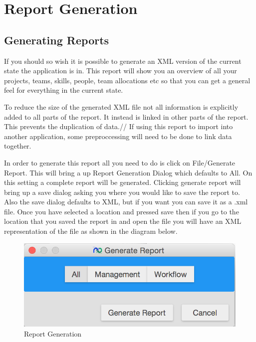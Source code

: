 \section{Report Generation}

\subsection{Generating Reports}

If you should so wish it is possible to generate an XML version of the current state the application is in. This report will show you an overview of all your projects, teams, skills, people, team allocations etc so that you can get a general feel for everything in the current state.

To reduce the size of the generated XML file not all information is explicitly added to all parts of the report. It instead is linked in other parts of the report. This prevents the duplication of data.//
If using this report to import into another application, some preproccessing will need to be done to link data together.

In order to generate this report all you need to do is click on File/Generate Report. This will bring a up Report Generation Dialog which defaults to All. On this setting a complete report will be generated. Clicking generate report will bring up a save dialog asking you where you would like to save the report to. Also the save dialog defaults to XML, but if you want you can save it as a .xml file. Once you have selected a location and pressed save then if you go to the location that you saved the report in and open the file you will have an XML representation of the file as shown in the diagram below.

\begin{figure}[H]
\centering
\includegraphics[width=\textwidth]{images/screenshots/report1.PNG}
\caption{Report Generation}
\label{fig:generate_report_all}
\end{figure}

